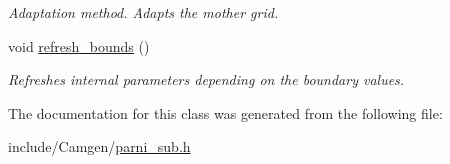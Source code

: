 \begin{DoxyCompactItemize}
\begin{DoxyCompactList}\small\item\em Adaptation method. Adapts the mother grid. \end{DoxyCompactList}\item 
\hypertarget{a00391_a43181dac8c2ea5bc539cbc0f223e3015}{void \hyperlink{a00391_a43181dac8c2ea5bc539cbc0f223e3015}{refresh\-\_\-bounds} ()}\label{a00391_a43181dac8c2ea5bc539cbc0f223e3015}

\begin{DoxyCompactList}\small\item\em Refreshes internal parameters depending on the boundary values. \end{DoxyCompactList}\end{DoxyCompactItemize}


The documentation for this class was generated from the following file\-:\begin{DoxyCompactItemize}
\item 
include/\-Camgen/\hyperlink{a00685}{parni\-\_\-sub.\-h}\end{DoxyCompactItemize}
